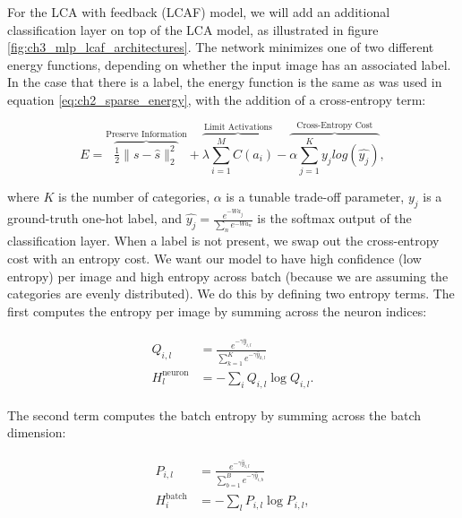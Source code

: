 For the LCA with feedback (LCAF) model, we will add an additional classification layer on top of the LCA model, as illustrated in figure \ref{fig:ch3_mlp_lcaf_architectures}. The network minimizes one of two different energy functions, depending on whether the input image has an associated label. In the case that there is a label, the energy function is the same as was used in equation \eqref{eq:ch2_sparse_energy}, with the addition of a cross-entropy term:

\begin{equation}\label{eq:ch3_lcaf_supervised_energy}
         E =
        \overbrace{ \tfrac{1}{2} \| s - \hat{s} \|_{2}^{2} }^\text{Preserve Information} +
        \overbrace{ \lambda \sum\limits_{i=1}^{M}C(a_{i}) }^\text{Limit Activations} -
        \overbrace{ \alpha \sum\limits_{j=1}^{K} y_{j}log(\hat{y_{j}})}^\text{Cross-Entropy Cost},
\end{equation}

\noindent where $K$ is the number of categories, $\alpha$ is a tunable trade-off parameter, $y_{j}$ is a ground-truth one-hot label, and $\hat{y_{j}} = \frac{e^{-Wa_{j}}}{\sum_{n}e^{-Wa_{n}}}$ is the softmax output of the classification layer. When a label is not present, we swap out the cross-entropy cost with an entropy cost. We want our model to have high confidence (low entropy) per image and high entropy across batch (because we are assuming the categories are evenly distributed). We do this by defining two entropy terms. The first computes the entropy per image by summing across the neuron indices:

\begin{align}\label{eq:ch3_lcaf_q_dist}
\begin{split}
  Q_{i,l} &= \frac{e^{-\gamma \hat{y}_{i,l}}}{\sum\limits_{k=1}^{K}e^{-\gamma \hat{y}_{k,l}}} \\
  H^{\text{neuron}}_{l} &= -\sum_{i}Q_{i,l}\log Q_{i,l}.
 \end{split}
\end{align}

The second term computes the batch entropy by summing across the batch dimension:

\begin{align}\label{eq:ch3_lcaf_p_dist}
\begin{split}
  P_{i,l} &= \frac{e^{-\gamma \hat{y}_{i,l}}}{\sum\limits_{b=1}^{B} e^{-\gamma \hat{y}_{i,b}}} \\
  H^{\text{batch}}_{i} &= -\sum_{l}P_{i,l}\log P_{i,l},
 \end{split}
\end{align}

